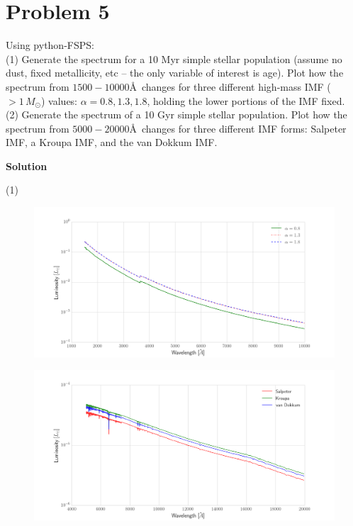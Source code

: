\documentclass[12pt,usletter,english]{article}
\begin{document}
\section{Problem 5}
Using python-FSPS: \\

(1) Generate the spectrum for a 10 Myr simple stellar population
(assume no dust, fixed metallicity, etc -- the only variable of
interest is age). Plot how the spectrum from $1500- 10000$\AA\ changes
for three different high-mass IMF ($>1\, M_{\odot}$) values:
$\alpha=0.8, 1.3, 1.8$, holding the lower portions of the IMF fixed.
\\

(2) Generate the spectrum of a 10 Gyr simple stellar population.  Plot
how the spectrum from $5000-20000$\AA\ changes for three different IMF
forms: Salpeter IMF, a Kroupa IMF, and the van Dokkum IMF.

\noindent \textbf{Solution}

(1)

\begin{figure}[!h]
  \centering \includegraphics[width=13cm]{ssp_highmass_imf.png}
  \caption{
    \label{fig:ssphighmass}}
\end{figure}

\begin{figure}[!h]
  \centering \includegraphics[width=13cm]{ssp_imfprofile.png}
  \caption{
    \label{fig:sspimf}}
\end{figure}
\end{document}

